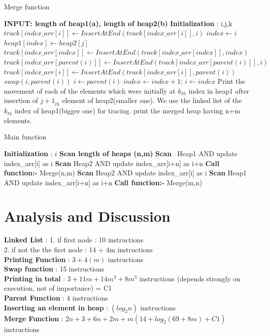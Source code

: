 \documentclass[conference]{IEEEtran}
\begin{document}
\begin{algorithm}[H]
\caption{Merge function}
\end{algorithm}
\begin{algorithmic}[1]
\STATE \textbf{INPUT: length of heap1(a), length of heap2(b)}
\STATE \textbf{Initialization} : i,j,k
	\STATE $track[index\_arr[i]] \gets InsertAtEnd(track[index\_arr[i]], i)$
\ENDFOR
\STATE $ index \gets i$
	\STATE $heap1[index] \gets heap2[j]$
    \STATE $track[index\_arr[index]] \gets InsertAtEnd(track[index\_arr[index]], index)$
    	\STATE $track[index\_arr[parent(i)]] \gets InsertAtEnd(track[index\_arr[parent(i)]], i)$
        \STATE $track[index\_arr[i]] \gets InsertAtEnd(track[index\_arr[i]], parent(i))$
        \STATE $swap(i,parent(i))$
        \STATE $i \gets parent(i)$
    \ENDWHILE
    \STATE $index \gets index+1$;
    \STATE $i \gets index$
    \STATE Print the movement of each of the elements which were initially at ${k}_{th}$ index in heap1 after insertion of  ${j+1}_{th}$ element of heap2(smaller one).
    \STATE We use the linked list of the ${k}_{th}$ index of heap1(bigger one) for tracing.
\ENDFOR
\STATE print the merged heap having n+m elements.
\end{algorithmic}

\begin{algorithm}[H]
\caption{Main function}
\end{algorithm}
\begin{algorithmic}[1]
\STATE \textbf{Initialization} : $ i$
\STATE \textbf{\textbf{Scan} length of heaps (n,m)}
		\STATE \textbf{Scan} \ Heap1 AND update index\_arr[i] as i
    \ENDFOR
		\STATE \textbf{Scan} Heap2 AND update index\_arr[i+n] as i+n
    \ENDFOR
    \STATE \textbf{Call function:-} Merge(n,m)
\ELSE
		\STATE \textbf{Scan} Heap2 AND update index\_arr[i] as i
    \ENDFOR
		\STATE \textbf{Scan} Heap1 AND update index\_arr[i+n] as i+n
    \ENDFOR
    \STATE \textbf{Call function:-} Merge(m,n)
\ENDIF

\end{algorithmic}

   
\section{\textbf{Analysis and Discussion}}
\textbf{Linked List} : 1. if first node : 10 instructions \\
2. if not the the first node : 14 + 4m instructions\\
\textbf{Printing Function} : $3 + 4(m)$ instructions\\
\textbf{Swap function} : 15 instructions\\
\textbf{Printing in total} : $3 + 11m + 14m^2 + 8m^3$ instructions (depends strongly on execution, not of importance) = C1\\
\textbf{Parent Function} : 4 instructions\\ 
\textbf{Inserting an element in heap} : $(log_{2}n)$ instructions\\
\textbf{Merge Function} : $2n + 3 + 6n + 2m + m(14 + log_2(69 + 8m) + C1)$ instructions\\
\end{document}
